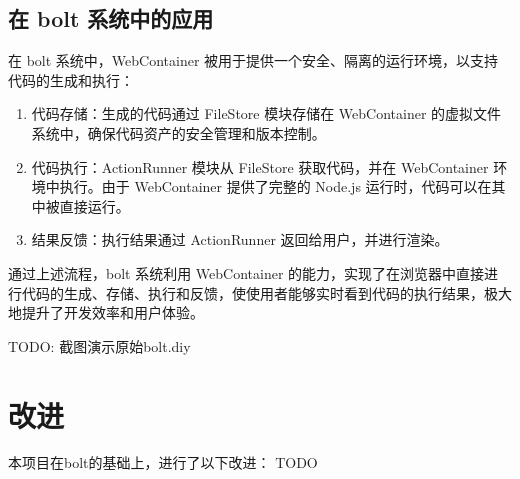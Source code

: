 \subsection{在 bolt 系统中的应用}

在 bolt 系统中，WebContainer 被用于提供一个安全、隔离的运行环境，以支持代码的生成和执行：

\begin{enumerate}

    \item 代码存储：生成的代码通过 FileStore 模块存储在 WebContainer 的虚拟文件系统中，确保代码资产的安全管理和版本控制。

    \item 代码执行：ActionRunner 模块从 FileStore 获取代码，并在 WebContainer 环境中执行。由于 WebContainer 提供了完整的 Node.js 运行时，代码可以在其中被直接运行。

    \item 结果反馈：执行结果通过 ActionRunner 返回给用户，并进行渲染。
\end{enumerate}

通过上述流程，bolt 系统利用 WebContainer 的能力，实现了在浏览器中直接进行代码的生成、存储、执行和反馈，使使用者能够实时看到代码的执行结果，极大地提升了开发效率和用户体验。 

TODO: 截图演示原始bolt.diy

\section{改进}

本项目在bolt的基础上，进行了以下改进：
TODO
